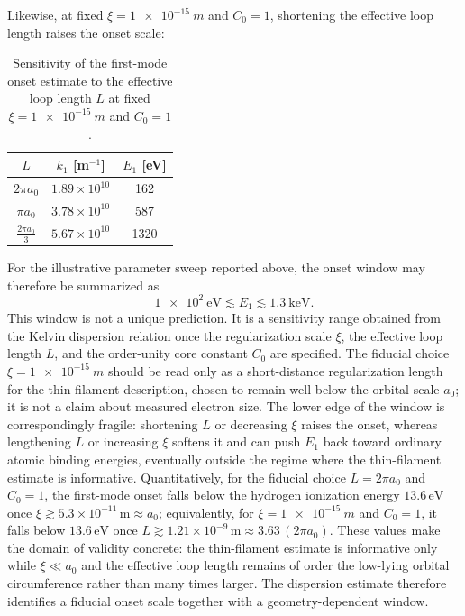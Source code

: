 \documentclass[pdflatex,sn-mathphys-num]{sn-jnl}
\begin{document}
        Likewise, at fixed $\xi=\SI{1e-15}{m}$ and $C_0=1$, shortening the effective loop length raises the onset scale:
        \begin{table}[htbp]
            \centering
            \caption{Sensitivity of the first-mode onset estimate to the effective loop length $L$ at fixed $\xi=\SI{1e-15}{m}$ and $C_0=1$.}
            \begin{tabular}{ccc}
                \toprule
                $L$ & $k_1$ [m$^{-1}$] & $E_1$ [eV] \\
                \midrule
                $2\pi a_0$      & $1.89\times 10^{10}$ & 162  \\
                $\pi a_0$       & $3.78\times 10^{10}$ & 587  \\
                $\tfrac{2\pi a_0}{3}$ & $5.67\times 10^{10}$ & 1320 \\
                \bottomrule
            \end{tabular}
            \label{tab:L-sensitivity}
        \end{table}

        For the illustrative parameter sweep reported above, the onset window may therefore be summarized as
        \begin{equation}
            \SI{1e2}{\electronvolt} \lesssim E_1 \lesssim \SI{1.3}{\kilo\electronvolt}.
        \end{equation}
        This window is not a unique prediction. It is a sensitivity range obtained from the Kelvin dispersion relation once the regularization scale $\xi$, the effective loop length $L$, and the order-unity core constant $C_0$ are specified. The fiducial choice $\xi=\SI{1e-15}{m}$ should be read only as a short-distance regularization length for the thin-filament description, chosen to remain well below the orbital scale $a_0$; it is not a claim about measured electron size. The lower edge of the window is correspondingly fragile: shortening $L$ or decreasing $\xi$ raises the onset, whereas lengthening $L$ or increasing $\xi$ softens it and can push $E_1$ back toward ordinary atomic binding energies, eventually outside the regime where the thin-filament estimate is informative. Quantitatively, for the fiducial choice $L=2\pi a_0$ and $C_0=1$, the first-mode onset falls below the hydrogen ionization energy $13.6\,\mathrm{eV}$ once $\xi \gtrsim 5.3\times 10^{-11}\,\mathrm{m}\approx a_0$; equivalently, for $\xi=\SI{1e-15}{m}$ and $C_0=1$, it falls below $13.6\,\mathrm{eV}$ once $L \gtrsim 1.21\times 10^{-9}\,\mathrm{m}\approx 3.63\,(2\pi a_0)$. These values make the domain of validity concrete: the thin-filament estimate is informative only while $\xi \ll a_0$ and the effective loop length remains of order the low-lying orbital circumference rather than many times larger. The dispersion estimate therefore identifies a fiducial onset scale together with a geometry-dependent window.
        \backmatter
\end{document}
